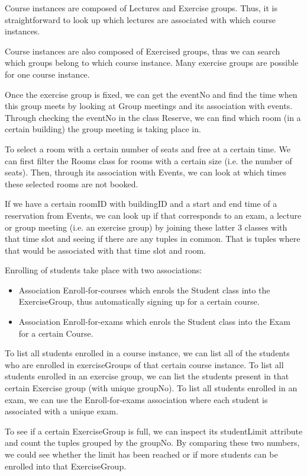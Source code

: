 \documentclass{article}
\begin{document}
Course instances are composed of Lectures and Exercise groups. Thus, it is straightforward to
look up which lectures are associated with which course instances.

Course instances are also composed of Exercised groups, thus we can search which groups
belong to which course instance. Many exercise groups are possible for one course instance.

Once the exercise group is fixed, we can get the eventNo and find the time when this group
meets by looking at Group meetings and its association with events. Through checking the
eventNo in the class Reserve, we can find which room (in a certain building) the group meeting
is taking place in.

To select a room with a certain number of seats and free at a certain time. We can first filter
the Rooms class for rooms with a certain size (i.e. the number of seats). Then, through its
association with Events, we can look at which times these selected rooms are not booked.

If we have a certain roomID with buildingID and a start and end time of a reservation from
Events, we can look up if that corresponds to an exam, a lecture or group meeting (i.e. an
exercise group) by joining these latter 3 classes with that time slot and seeing if there are any
tuples in common. That is tuples where that would be associated with that time slot and
room.

Enrolling of students take place with two associations:
\begin{itemize}
	\item Association Enroll-for-courses which enrols the Student class into the ExerciseGroup,
	thus automatically signing up for a certain course.
	\item Association Enroll-for-exams which enrols the Student class into the Exam for a certain
	Course.
\end{itemize}

To list all students enrolled in a course instance, we can list all of the students who are
enrolled in exerciseGroups of that certain course instance. To list all students enrolled in an
exercise group, we can list the students present in that certain Exercise group (with unique
groupNo). To list all students enrolled in an exam, we can use the Enroll-for-exams association
where each student is associated with a unique exam.


To see if a certain ExerciseGroup is full, we can inspect its studentLimit attribute and count
the tuples grouped by the groupNo. By comparing these two numbers, we could see whether
the limit has been reached or if more students can be enrolled into that ExerciseGroup.
\end{document}
